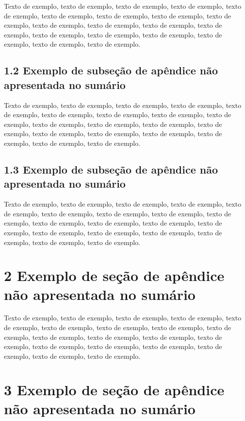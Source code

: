 \documentclass[
	12pt,				%
	oneside,			%
	a4paper,			%
	english,			%
	brazil				%
	]{abntex2ppgsi}
\begin{document}
\begin{apendicesenv}
Texto de exemplo, texto de exemplo, texto de exemplo, texto de exemplo, texto de exemplo, texto de exemplo, texto de exemplo, texto de exemplo, texto de exemplo, texto de exemplo, texto de exemplo, texto de exemplo, texto de exemplo, texto de exemplo, texto de exemplo, texto de exemplo, texto de exemplo, texto de exemplo, texto de exemplo.

\subsection*{1.2 Exemplo de subseção de apêndice não apresentada no sumário}

Texto de exemplo, texto de exemplo, texto de exemplo, texto de exemplo, texto de exemplo, texto de exemplo, texto de exemplo, texto de exemplo, texto de exemplo, texto de exemplo, texto de exemplo, texto de exemplo, texto de exemplo, texto de exemplo, texto de exemplo, texto de exemplo, texto de exemplo, texto de exemplo, texto de exemplo.

\subsection*{1.3 Exemplo de subseção de apêndice não apresentada no sumário}

Texto de exemplo, texto de exemplo, texto de exemplo, texto de exemplo, texto de exemplo, texto de exemplo, texto de exemplo, texto de exemplo, texto de exemplo, texto de exemplo, texto de exemplo, texto de exemplo, texto de exemplo, texto de exemplo, texto de exemplo, texto de exemplo, texto de exemplo, texto de exemplo, texto de exemplo.

\section*{2 Exemplo de seção de apêndice não apresentada no sumário}

Texto de exemplo, texto de exemplo, texto de exemplo, texto de exemplo, texto de exemplo, texto de exemplo, texto de exemplo, texto de exemplo, texto de exemplo, texto de exemplo, texto de exemplo, texto de exemplo, texto de exemplo, texto de exemplo, texto de exemplo, texto de exemplo, texto de exemplo, texto de exemplo, texto de exemplo.

\section*{3 Exemplo de seção de apêndice não apresentada no sumário}


\end{apendicesenv}
\end{document}
